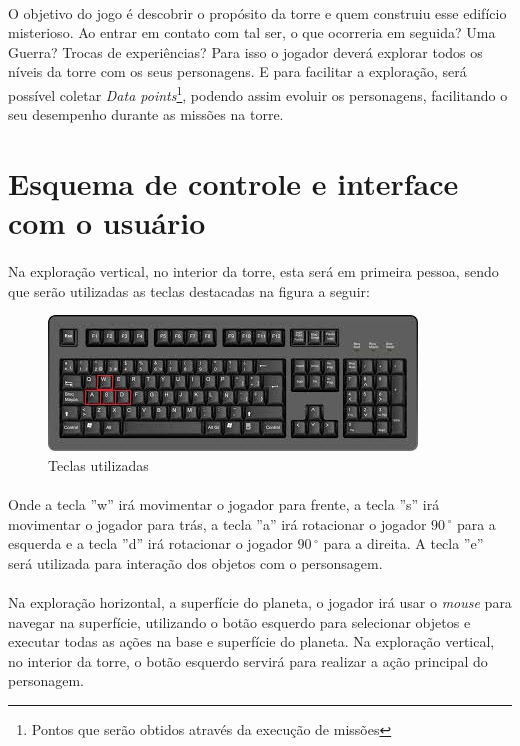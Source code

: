\documentclass[11pt]{article} %
\begin{document}
\paragraph{}O objetivo do jogo é descobrir o propósito da torre e quem construiu esse edifício misterioso. Ao entrar em contato com tal ser, o que ocorreria em seguida? Uma Guerra? Trocas de experiências? Para isso o jogador deverá explorar todos os níveis da torre com os seus personagens. E para facilitar a exploração, será possível coletar \textit{Data points}\footnote{Pontos que serão obtidos através da execução de missões}, podendo assim evoluir os personagens, facilitando o seu desempenho durante as missões na torre. 

\section{Esquema de controle e interface com o usuário}

\paragraph{}Na exploração vertical, no interior da torre, esta será em primeira pessoa, sendo que serão utilizadas as teclas destacadas na figura a seguir:\\

\begin{figure}[!htp]
\centering
\includegraphics[scale=0.75]{res/keyboard.jpg}
\caption{Teclas utilizadas}
\label{Teclado}
\end{figure}

\paragraph{}Onde a tecla ''w'' irá movimentar o jogador para frente, a tecla ''s'' irá movimentar o jogador para trás, a tecla ''a'' irá rotacionar o jogador $90\,^{\circ}$ para a esquerda e a tecla ''d'' irá rotacionar o jogador $90\,^{\circ}$ para a direita. A tecla ''e'' será utilizada para interação dos objetos com o personsagem.

\paragraph{}Na exploração horizontal, a superfície do planeta, o jogador irá usar o \textit{mouse} para navegar na superfície, utilizando o botão esquerdo para selecionar objetos e executar todas as ações na base e superfície do planeta. Na exploração vertical, no interior da torre, o botão esquerdo servirá para realizar a ação principal do personagem.
\end{document}

